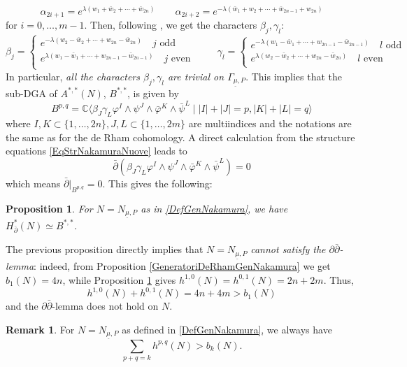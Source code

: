 \documentclass[a4paper, 11pt]{amsart}
\theoremstyle{plain}
\newtheorem{proposizione}{Proposition} [section]
\theoremstyle{definition}
\newtheorem{osservazione}{Remark}[section]
\newcommand{\del}{\partial}
\newcommand{\delbar}{\bar{\partial}}
\newcommand{\C}{\mathbb{C}}
\numberwithin{equation}{section}
\begin{document}
\[\alpha_{2i+1} = e^{\lambda(w_{1} + \bar w_{2} + \cdots + \bar w_{2n})} \qquad \alpha_{2i+2} = e^{-\lambda(\bar w_{1} + w_{2} + \cdots + \bar w_{2n-1} + w_{2n})}\]
for $i = 0, \ldots, m-1$. Then, following \cite[lemma 2.2]{Kasuya}, we get the characters $\beta_{j}, \gamma_{l}$:
\[\beta_{j} = \begin{cases}
    e^{-\lambda(w_{2} - \bar w_{2} + \cdots + w_{2n} - \bar w_{2n})} \quad j \text{ odd } \\
    e^{\lambda(w_{1} - \bar w_{1} + \cdots + w_{2n-1} - \bar w_{2n-1})} \quad j \text{ even } \\
\end{cases} \qquad \gamma_{l} = \begin{cases}
    e^{-\lambda(w_{1} - \bar w_{1} + \cdots + w_{2n-1} - \bar w_{2n-1})} \quad l \text{ odd } \\
    e^{\lambda(w_{2} - \bar w_{2} + \cdots + w_{2n} - \bar w_{2n})} \quad l \text{ even } \\
\end{cases}\]
In particular, \textit{all the characters $\beta_{j}, \gamma_{l}$ are trivial on $\Gamma_{\underline{\mu}, P}$}. This implies that the sub-DGA of $A^{*,*}(N)$, $B^{*,*}$, is given by
\[B^{p,q} = \C\langle \beta_{J}\gamma_{L}\varphi^{I} \wedge \psi^{J} \wedge \bar\varphi^{K} \wedge \bar\psi^{L} \mid |I| + |J| = p, |K| + |L| = q \rangle\]
where $I,K \subset \{1, \ldots, 2n\}, J,L \subset \{1, \ldots, 2m\}$ are multiindices and the notations are the same as for the de Rham cohomology. A direct calculation from the structure equations \eqref{EqStrNakamuraNuove} leads to \[\delbar(\beta_{J}\gamma_{L}\varphi^{I} \wedge \psi^{J} \wedge \bar\varphi^{K} \wedge \bar\psi^{L}) = 0\] which means $\delbar|_{B^{p,q}} = 0$. This gives the following:
\begin{proposizione}\label{GeneratoriDolbeaultGenNakamura}
    For $N = N_{\underline{\mu}, P}$ as in \eqref{DefGenNakamura}, we have $H^{*}_{\delbar}(N) \simeq B^{*,*}$.
\end{proposizione}
The previous proposition directly implies that $N = N_{\underline{\mu}, P}$ \textit{cannot satisfy the $\del\delbar$-lemma}: indeed, from Proposition \ref{GeneratoriDeRhamGenNakamura} we get $b_{1}(N) = 4n$, while Proposition \ref{GeneratoriDolbeaultGenNakamura} gives $h^{1,0}(N) = h^{0,1}(N) = 2n+2m$. Thus, 
\[h^{1,0}(N) + h^{0,1}(N) = 4n + 4m > b_{1}(N)\] 
and the $\del\delbar$-lemma does not hold on $N$. 

\begin{osservazione}\label{NoDelDelBar}
    For $N = N_{\underline{\mu}, P}$ as defined in \eqref{DefGenNakamura}, we always have \[\sum_{p+q = k} h^{p,q}(N) > b_{k}(N).\]
\end{osservazione}
\end{document}
